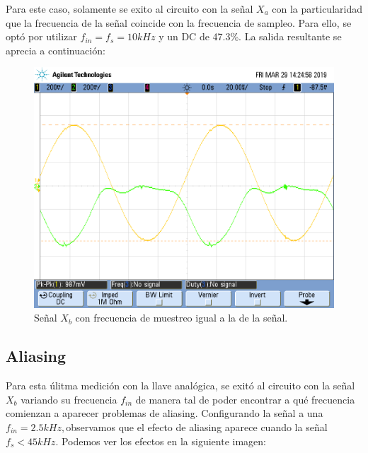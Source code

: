 \documentclass[../../ASSD_TP1_G7.tex]{subfiles}
\begin{document}
Para este caso, solamente se exito al circuito con la señal $X_{a}$
con la particularidad que la frecuencia de la señal coincide con la
frecuencia de sampleo. Para ello, se optó por utilizar $f_{in}=f_{s}=10kHz$
y un DC de 47.3\%. La salida resultante se aprecia a continuación:

\begin{figure}[H]
\begin{centering}
\includegraphics[scale=0.3]{Imagenes/llave_senooo_pto_c}\caption{Señal $X_{b}$ con frecuencia de muestreo igual a la de la señal.}
\par\end{centering}
\end{figure}


\subsection{Aliasing}

Para esta úlitma medición con la llave analógica, se exitó al circuito
con la señal $X_{b}$ variando su frecuencia $f_{in}$ de manera tal
de poder encontrar a qué frecuencia comienzan a aparecer problemas
de aliasing. Configurando la señal a una $f_{in}=2.5kHz,$observamos
que el efecto de aliasing aparece cuando la señal $f_{s}<45kHz$.
Podemos ver los efectos en la siguiente imagen:
\end{document}
